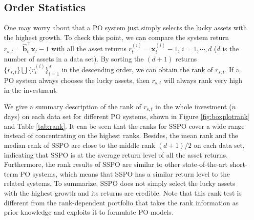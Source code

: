 \documentclass[twoside,11pt]{article}
\begin{document}
\subsection{Order Statistics}
\label{sec:orderstat}
One may worry about that a PO system just simply selects the lucky assets with the highest growth. To check this point, we can compare the system return $r_{s,t}=\hat{\mathbf{b}}_{t}^\top\mathbf{x}_t-1$ with all the asset returns $r_{t}^{(i)}=\mathbf{x}_t^{(i)}-1$, $i=1,\cdots,d$ ($d$ is the number of assets in a data set). By sorting the $(d+1)$ returns $\{r_{s,t}\}\bigcup\{r_{t}^{(i)}\}_{i=1}^d$ in the descending order, we can obtain the rank of $r_{s,t}$. If a PO system always chooses the lucky assets, then $r_{s,t}$ will always rank very high in the investment.

We give a summary description of the rank of $r_{s,t}$ in the whole investment ($n$ days) on each data set for different PO systems, shown in Figure \ref{fig:boxplotrank} and Table \ref{tab:rank}. It can be seen that the ranks for SSPO cover a wide range instead of concentrating on the highest ranks. Besides, the mean rank and the median rank of SSPO are close to the middle rank $(d+1)/2$ on each data set, indicating that SSPO is at the average return level of all the asset returns. Furthermore, the rank results of SSPO are similar to other state-of-the-art short-term PO systems, which means that SSPO has a similar return level to the related systems. To summarize, SSPO does not simply select the lucky assets with the highest growth and its returns are credible. Note that this rank test is different from the rank-dependent portfolio \citep{stoport} that takes the rank information as prior knowledge and exploits it to formulate PO models.
\end{document}
